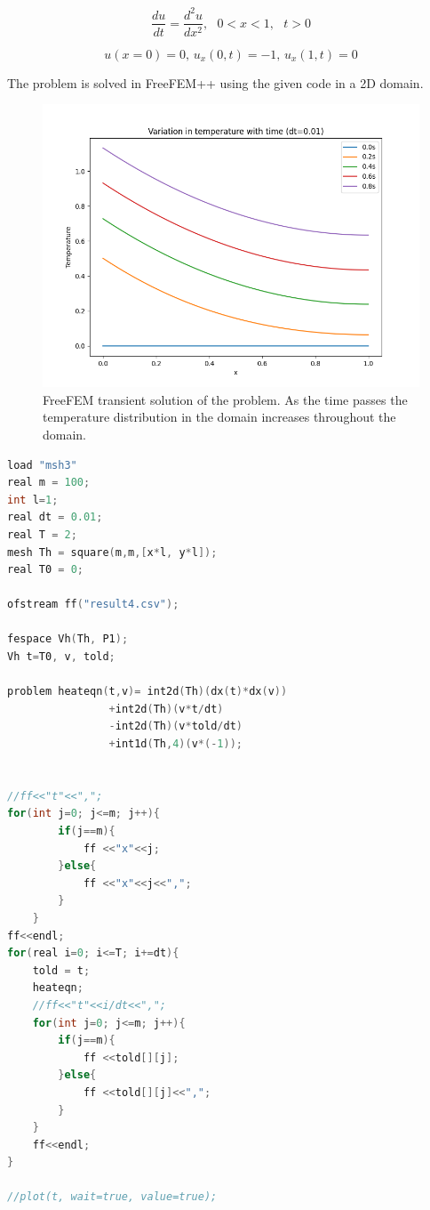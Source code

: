 \documentclass[11pt]{article} %
\begin{document}
\begin{equation}
\frac{du}{dt} = \frac{d^2u}{dx^2}, \text{ }0 < x < 1, \text{ }t>0
\end{equation}

\begin{equation}
u(x=0) = 0 \text{,  } u_x(0,t) =-1\text{, } u_x(1,t)=0 
\end{equation}

\vspace{0.5cm}

The problem is solved in FreeFEM++ using the given code in a 2D domain. 

\begin{figure}[H]
\centering
\includegraphics[width=\textwidth]{figures/p41.png}
\caption{FreeFEM transient solution of the problem. As the time passes the temperature distribution in the domain increases throughout the domain.}
\end{figure}
\newpage
\begin{lstlisting}[language=C++, caption=Problem 4 Code ]
load "msh3"
real m = 100;
int l=1;
real dt = 0.01;
real T = 2;
mesh Th = square(m,m,[x*l, y*l]);
real T0 = 0; 

ofstream ff("result4.csv");

fespace Vh(Th, P1);
Vh t=T0, v, told;

problem heateqn(t,v)= int2d(Th)(dx(t)*dx(v))
				+int2d(Th)(v*t/dt)
				-int2d(Th)(v*told/dt)
				+int1d(Th,4)(v*(-1));


//ff<<"t"<<",";
for(int j=0; j<=m; j++){
		if(j==m){
			ff <<"x"<<j;
		}else{
			ff <<"x"<<j<<",";
		}
	}
ff<<endl;
for(real i=0; i<=T; i+=dt){
	told = t;
	heateqn;
	//ff<<"t"<<i/dt<<",";
	for(int j=0; j<=m; j++){
		if(j==m){
			ff <<told[][j];
		}else{
			ff <<told[][j]<<",";
		}
	}
	ff<<endl;
}

//plot(t, wait=true, value=true);
\end{lstlisting}
\end{document}
